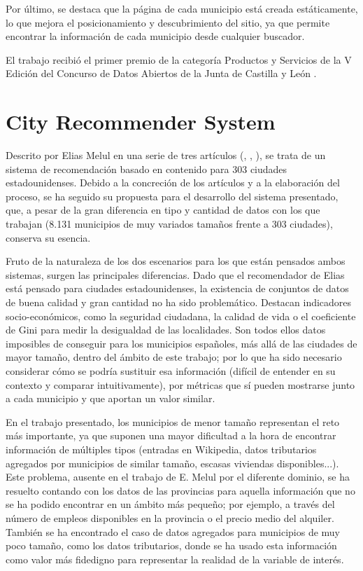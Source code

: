 Por último, se destaca que la página de cada municipio está creada estáticamente, lo que mejora el posicionamiento y descubrimiento del sitio, ya que permite encontrar la información de cada municipio desde cualquier buscador.

El trabajo recibió el primer premio de la categoría Productos y Servicios de la V Edición del Concurso de Datos Abiertos de la Junta de Castilla y León \cite{cyl}.

\section{City Recommender System}

Descrito por Elias Melul en una serie de tres artículos (\cite{US1}, \cite{US2}, \cite{US3}), se trata de un sistema de recomendación basado en contenido para 303 ciudades estadounidenses. Debido a la concreción de los artículos y a la elaboración del proceso, se ha seguido su propuesta para el desarrollo del sistema presentado, que, a pesar de la gran diferencia en tipo y cantidad de datos con los que trabajan (8.131 municipios de muy variados tamaños frente a 303 ciudades), conserva su esencia.

Fruto de la naturaleza de los dos escenarios para los que están pensados ambos sistemas, surgen las principales diferencias. Dado que el recomendador de Elias está pensado para ciudades estadounidenses, la existencia de conjuntos de datos de buena calidad y gran cantidad no ha sido problemático. Destacan indicadores socio-económicos, como la seguridad ciudadana, la calidad de vida o el coeficiente de Gini para medir la desigualdad de las localidades. Son todos ellos datos imposibles de conseguir para los municipios españoles, más allá de las ciudades de mayor tamaño, dentro del ámbito de este trabajo; por lo que ha sido necesario considerar cómo se podría sustituir esa información (difícil de entender en su contexto y comparar intuitivamente), por métricas que sí pueden mostrarse junto a cada municipio y que aportan un valor similar.

En el trabajo presentado, los municipios de menor tamaño representan el reto más importante, ya que suponen una mayor dificultad a la hora de encontrar información de múltiples tipos (entradas en Wikipedia, datos tributarios agregados por municipios de similar tamaño, escasas viviendas disponibles...). Este problema, ausente en el trabajo de E. Melul por el diferente dominio, se ha resuelto contando con los datos de las provincias para aquella información que no se ha podido encontrar en un ámbito más pequeño; por ejemplo, a través del número de empleos disponibles en la provincia o el precio medio del alquiler. También se ha encontrado el caso de datos agregados para municipios de muy poco tamaño, como los datos tributarios, donde se ha usado esta información como valor más fidedigno para representar la realidad de la variable de interés.

